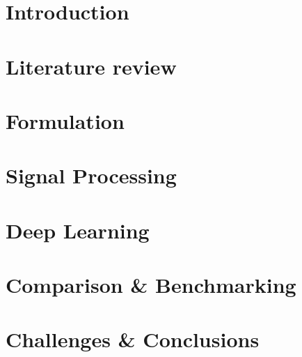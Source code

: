 \documentclass[harvard]{lincolncsuthesis}
\begin{document}
\maketitle

%




%

\thesisTables

\thesisBodyStart

\chapter{Introduction}


\chapter{Literature review}


\chapter{Formulation}


\chapter{Signal Processing}


\chapter{Deep Learning}


\chapter{Comparison & Benchmarking}


\chapter{Challenges & Conclusions}

\end{document}

